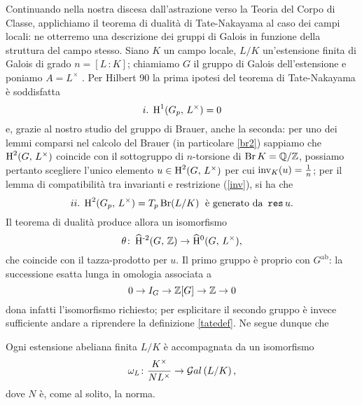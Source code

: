 Continuando nella nostra discesa dall'astrazione verso la Teoria del Corpo di Classe, applichiamo il teorema di dualità di Tate-Nakayama al caso dei campi locali: ne otterremo una descrizione dei gruppi di Galois in funzione della struttura del campo stesso. Siano $ K $ un campo locale, $ L / K  $ un'estensione finita di Galois di grado $ n = [L\,\colon K] $; chiamiamo $ G $ il gruppo di Galois dell'estensione e poniamo $ A = L^\times $ . Per Hilbert 90 la prima ipotesi del teorema di Tate-Nakayama è soddisfatta 
\[ i. \; \operatorname{H}^1(G_p,\, L^\times) = 0 \]
e, grazie al nostro studio del gruppo di Brauer, anche la seconda: per uno dei lemmi comparsi nel calcolo del Brauer (in particolare \ref{br2}) sappiamo che $ \operatorname{H}^2(G, \, L^\times) $ coincide con il sottogruppo di $ n $-torsione di $ \operatorname{Br} K = \mathbb{Q}/\mathbb{Z} $, possiamo pertanto scegliere l'unico elemento $ u \in \operatorname{H}^2(G, \, L^\times) $ per cui $ \operatorname{inv}_K(u) = \frac{1}{n} $; per il lemma di compatibilità tra invarianti e restrizione (\ref{inv}), si ha che
\[ ii. \; \operatorname{H}^2(G_p, \, L^\times) = T_p \operatorname{Br}(L/K) \;\text{ è generato da } \operatorname{\mathtt{res}} u. \]
Il teorema di dualità produce allora un isomorfismo
\[ \theta\colon \operatorname{\widehat{H}^{-2}}(G, \, \mathbb{Z}) \to \operatorname{\widehat{H}^{0}}(G, \,  L^\times), \]
che coincide con il tazza-prodotto per $ u. $ Il primo gruppo è proprio con $ G^\text{ab} $: la successione esatta lunga in omologia associata a 
\[ 0 \to I_G \to \mathbb{Z}[G] \to \mathbb{Z} \to 0 \]
dona infatti l'isomorfismo richiesto; per esplicitare il secondo gruppo è invece sufficiente andare a riprendere la definizione \eqref{tatedef}. Ne segue dunque che

\begin{theorem}
	Ogni estensione abeliana finita $ L/K $ è accompagnata da un isomorfismo
	\[ \omega_L\colon \frac{K^\times}{NL^\times} \to \mathcal{G}al\left( L/K \right), \]
	dove $ N $ è, come al solito, la norma.
\end{theorem}


